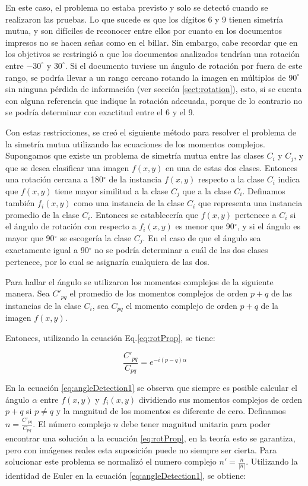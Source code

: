 \documentclass[a4paper, 11pt, oneside]{report}
\begin{document}
En este caso, el problema no estaba previsto y solo se detectó cuando se realizaron las pruebas. Lo que sucede es que los dígitos 6 y 9 tienen simetría mutua, y son difíciles de reconocer entre ellos por cuanto en los documentos impresos no se hacen señas como en el billar. Sin embargo, cabe recordar que en los objetivos se restringió a que los documentos analizados tendrían una rotación entre $-30^\circ$ y $30^\circ$. Si el documento tuviese un ángulo de rotación por fuera de este rango, se podría llevar a un rango cercano rotando la imagen en múltiplos de $90^\circ$ sin ninguna pérdida de información (ver sección \ref{sect:rotation}), esto, si se cuenta con alguna referencia que indique la rotación adecuada, porque de lo contrario no se podría determinar con exactitud entre el 6 y el 9.

Con estas restricciones, se creó el siguiente método para resolver el problema de la simetría mutua utilizando las ecuaciones de los momentos complejos. Supongamos que existe un problema de simetría mutua entre las clases $C_i$ y $C_j$, y que se desea clasificar una imagen $f(x,y)$ en una de estas dos clases. Entonces una rotación cercana a 180$^\circ$ de la instancia $f(x,y)$ respecto a la clase $C_i$ indica que $f(x,y)$ tiene mayor similitud a la clase $C_j$ que a la clase $C_i$. Definamos también $f_i(x,y)$ como una instancia de la clase $C_i$ que representa una instancia promedio de la clase $C_i$. Entonces se establecería que $f(x,y)$ pertenece a $C_i$ si el ángulo de rotación con respecto a $f_i(x,y)$ es menor que 90$^\circ$, y si el ángulo es mayor que 90$^\circ$ se escogería la clase $C_j$. En el caso de que el ángulo sea exactamente igual a 90$^\circ$ no se podría determinar a cuál de las dos clases pertenece, por lo cual se asignaría  cualquiera de las dos.

Para hallar el ángulo se utilizaron los momentos complejos de la siguiente manera. Sea $C'_{pq}$ el promedio de los momentos complejos de orden $p+q$ de las instancias de la clase $C_i$, sea $C_{pq}$ el momento complejo de orden $p+q$ de la imagen $f(x,y)$.

Entonces, utilizando la ecuación Eq.\ref{eq:rotProp}, se tiene:

	\begin{equation}\label{eq:angleDetection1}
		\frac{C'_{pq}}{C_{pq}} = e^{-i(p-q)\alpha}
	\end{equation}

En la ecuación \ref{eq:angleDetection1} se observa que siempre es posible calcular el ángulo $\alpha$ entre $f(x,y)$ y $f_i(x,y)$ dividiendo sus momentos complejos de orden $p+q$ si $p \neq q$ y la magnitud de los momentos es diferente de cero. Definamos $n=\frac{C'_{pq}}{C_{pq}}$. El número complejo $n$ debe tener magnitud unitaria para poder encontrar una solución a la ecuación \ref{eq:rotProp}, en la teoría esto se garantiza, pero con imágenes reales esta suposición puede no siempre ser cierta. Para solucionar este problema se normalizó el numero complejo $n'=\frac{n}{|n|}$. Utilizando la identidad de Euler en la ecuación \ref{eq:angleDetection1}, se obtiene:
\end{document}
